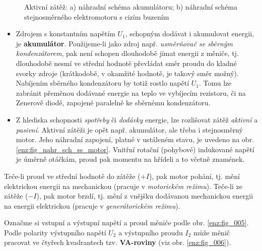 {      \begin{figure}[ht!]
        \centering
        \hspace{1cm}
        \caption{Aktivní zátěž: a) náhradní schéma akumulátoru; b) náhradní schéma stejnosměrného 
          elektromotoru s cizím buzením}
        \label{enz:fig_aktivni_zatez}
      \end{figure}        
      \begin{itemize}\addtolength{\itemsep}{-0.5\baselineskip}
        \item Zdrojem s konstantním napětím $U_1$, schopným dodávat i akumulovat energii, je
              \textbf{akumulátor}. Použijeme-li jako zdroj např.\emph{ usměrňovač se sběrným 
              kondenzátorem}, pak není schopen dlouhodobě jímat energii z měniče, tj. dlouhodobě 
              nesmí ve střední hodnotě převládat směr proudu do kladné svorky zdroje (krátkodobě, 
              v okamžité hodnotě, je takový směr možný). Nabíjením sběrného kondenzátoru by totiž 
              rostlo napětí $U_1$. Tomu lze zabránit přeměnou dodávané energie na teplo ve 
              vybíjecím rezistoru, či na Zenerově diodě, zapojené paralelně ke sběrnému 
              kondenzátoru.
        \item Z hlediska schopnosti \emph{spotřeby} či \emph{dodávky} energie, lze rozlišovat 
              zátěž \emph{aktivní} a \emph{pasivní}. Aktivní zátěži je opět např. akumulátor, ale 
              třeba i stejnosměrný motor. Jeho náhradní zapojení, platné v ustáleném stavu, je 
              uvedeno na obr. \ref{enz:fig_nahr_sch_ss_motor}. Vnitřní rotační (pohybové) 
              indukované napětí je úměrně otáčkám, proud pak momentu na hřídeli a to včetně 
              znamének.
      \end{itemize}
      

      Teče-li proud ve  střední hodnotě do zátěže (\(+I\)), pak motor pohání, tj. mění elektrickou
      energii na mechanickou (pracuje v \emph{motorickém režimu}). Teče-li ze zátěže (\(-I\)), pak
      motor brzdí, tj. mění z vnějšku dodávanou mechanickou energii na energii elektrickou
      (pracuje v \emph{generátorickém režimu}).       
      
      Označme si vstupní a výstupní napětí a proud měniče podle obr. \ref{enz:fig_005}. Podle 
      polarity výstupního napětí $U_2$ a výstupního proudu $I_2$ může měnič pracovat ve čtyřech 
      kvadrantech tzv.\textbf{ VA-roviny} (viz obr. \ref{enz:fig_006}).

}
